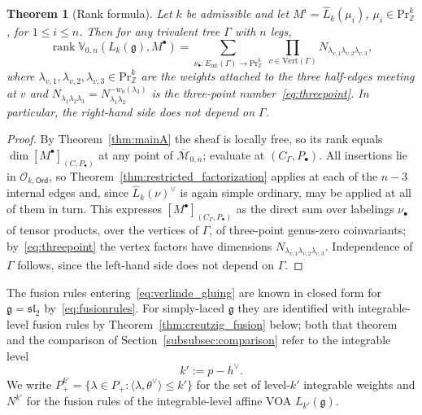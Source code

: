 \documentclass[12pt,a4paper,reqno]{amsart}
\numberwithin{equation}{section}
\newtheorem{theorem}{Theorem}[section]
\theoremstyle{definition}
\newcommand{\g}{\mathfrak{g}}
\renewcommand{\sl}{\mathfrak{sl}}
\newcommand{\rk}{\operatorname{rank}}
\newcommand{\Z}{\mathbb{Z}}
\newcommand{\M}{\mathcal{M}}
\def\O{\mathcal{O}}
\def\Ord{\mathsf{Ord}}
\def\Pr{\mathrm{Pr}}
\def\la{\lambda}
\def\ra{\rightarrow}
\def\<{\langle}
\def\>{\rangle}
\def\VV{\mathbb{V}}
\begin{document}
\begin{theorem}[Rank formula]\label{thm:rank_formula}
Let $k$ be admissible and let $M^i=\hat{L}_k(\mu_i)$, $\mu_i\in \Pr^k_\Z$, for $1\leq i\leq n$. Then for any trivalent tree $\Gamma$ with $n$ legs,
\begin{equation}\label{eq:verlinde_gluing}
    \rk \VV_{0,n}(L_k(\g),M^\bullet) = \sum_{\nu_\bullet: E_{\mathrm{int}}(\Gamma)\ra \Pr^k_\Z} \ \prod_{v\in \mathrm{Vert}(\Gamma)} N_{\la_{v,1}\la_{v,2}\la_{v,3}},
\end{equation}
where $\la_{v,1},\la_{v,2},\la_{v,3}\in \Pr^k_\Z$ are the weights attached to the three half-edges meeting at $v$ and $N_{\la_1\la_2\la_3}=N_{\la_1\la_2}^{-w_0(\la_3)}$ is the three-point number~\eqref{eq:threepoint}. In particular, the right-hand side does not depend on $\Gamma$.
\end{theorem}
\begin{proof}
By Theorem~\ref{thm:mainA} the sheaf is locally free, so its rank equals $\dim [M^\bullet]_{(C,P_\bullet)}$ at any point of $\overline{\M}_{0,n}$; evaluate at $(C_\Gamma,P_\bullet)$. All insertions lie in $\O_{k,\Ord}$, so Theorem~\ref{thm:restricted_factorization} applies at each of the $n-3$ internal edges and, since $\hat{L}_k(\nu)^\vee$ is again simple ordinary, may be applied at all of them in turn. This expresses $[M^\bullet]_{(C_\Gamma,P_\bullet)}$ as the direct sum over labelings $\nu_\bullet$ of tensor products, over the vertices of $\Gamma$, of three-point genus-zero coinvariants; by~\eqref{eq:threepoint} the vertex factors have dimensions $N_{\la_{v,1}\la_{v,2}\la_{v,3}}$. Independence of $\Gamma$ follows, since the left-hand side does not depend on $\Gamma$.
\end{proof}

The fusion rules entering~\eqref{eq:verlinde_gluing} are known in closed form for $\g=\sl_2$ by~\eqref{eq:fusionrules}. For simply-laced $\g$ they are identified with integrable-level fusion rules by Theorem~\ref{thm:creutzig_fusion} below; both that theorem and the comparison of Section~\ref{subsubsec:comparison} refer to the integrable level
\begin{equation}\label{eq:kprime}
k':=p-h^\vee.
\end{equation}
We write $P^{k'}_+=\{\la\in P_+:\<\la,\theta^\vee\>\leq k'\}$ for the set of level-$k'$ integrable weights and $N^{k'}$ for the fusion rules of the integrable-level affine VOA $L_{k'}(\g)$.
\end{document}
